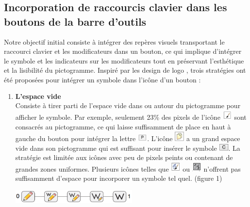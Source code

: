 \documentclass[12pt,a4paper]{article}
\begin{document}
\subsection{Incorporation de raccourcis clavier dans les boutons de la barre d’outils}
Notre objectif initial consiste à intégrer des repères visuels transportant le raccourci clavier et les modificateurs dans un bouton, ce qui implique d'intégrer le symbole et les indicateurs sur les
modificateurs tout en préservant l'esthétique et la lisibilité du pictogramme.
Inspiré par les design de logo \cite{18}, trois stratégies ont été proposées pour intégrer un symbole dans l'icône d'un bouton \cite{3} :
\begin{enumerate}
\item {\large \textbf{L’espace vide}}\\
Consiste à tirer parti de l'espace vide dans ou autour du pictogramme pour afficher le symbole. Par exemple, seulement 23\% des pixels de l’icône \includegraphics[width=0.04\textwidth]{i1.png} sont consacrés au pictogramme, ce qui laisse suffisamment de place en haut à gauche du bouton pour intégrer la lettre \includegraphics[width=0.04\textwidth]{i2.png}. L'icône \includegraphics[width=0.04\textwidth]{i3.png} a un grand
espace vide dans son pictogramme qui est suffisant pour insérer le symbole \includegraphics[width=0.04\textwidth]{i4.png}. La stratégie est limitée aux icônes avec peu de pixels peints ou contenant de grandes zones uniformes. Plusieurs icônes telles que \includegraphics[width=0.04\textwidth]{i5.png} ou \includegraphics[width=0.04\textwidth]{i6.png} n’offrent pas suffisamment d'espace pour incorporer un symbole tel quel.
(figure 1)
\begin{center}
	\includegraphics[width=0.5\textwidth]{T1.png}\\

\end{center}
\end{enumerate}
\end{document}
